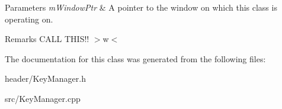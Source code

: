 \begin{DoxyParams}{Parameters}
{\em m\+Window\+Ptr} & A pointer to the window on which this class is operating on.\\
\hline
\end{DoxyParams}
\begin{DoxyRemark}{Remarks}
C\+A\+LL T\+H\+I\+S!! $>$w$<$ 
\end{DoxyRemark}


The documentation for this class was generated from the following files\+:\begin{DoxyCompactItemize}
\item 
header/Key\+Manager.\+h\item 
src/Key\+Manager.\+cpp\end{DoxyCompactItemize}
